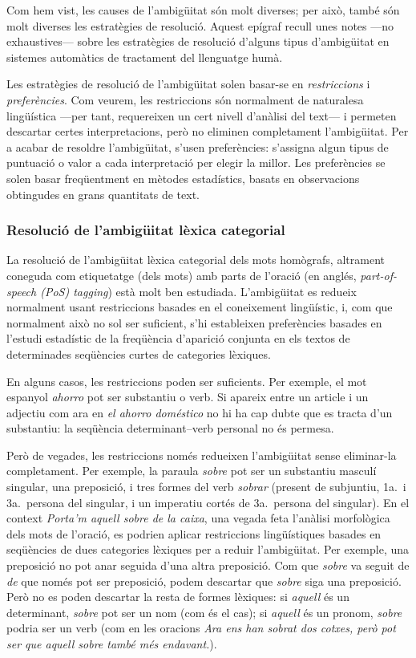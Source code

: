 Com hem vist, les causes de l'ambigüitat són molt diverses; per això,
també són molt diverses les estratègies de resolució. Aquest epígraf
recull unes notes ---no exhaus\-tives--- sobre les estratègies de
resolució d'alguns tipus d'ambigüitat en sistemes automàtics de
tractament del llenguatge humà.

Les estratègies de resolució de l'ambigüitat solen basar-se en
\emph{restriccions} i \emph{preferències}. Com veurem, les
restriccions són normalment de naturalesa lingüística ---per tant,
requereixen un cert nivell d'anàlisi del text--- i permeten descartar
certes interpretacions, però no eliminen completament l'ambigüitat.
Per a acabar de resoldre l'ambigüitat, s'usen preferències: s'assigna
algun tipus de puntuació o valor a cada interpretació per elegir la
millor. Les preferències se solen basar freqüentment en mètodes
estadístics, basats en observacions obtingudes en grans quantitats de
text.

\subsubsection{Resolució de l'ambigüitat lèxica categorial}
\label{s3:reshom}
La resolució de l'ambigüitat lèxica categorial dels mots homògrafs,
altrament coneguda com etiquetatge (dels mots) amb parts de l'oració
(en anglés, \emph{part-of-speech (PoS) tagging}) està molt ben
estudiada.  L'ambigüitat es redueix normalment usant restriccions
basades en el coneixement lingüístic, i, com que normalment això no
sol ser suficient, s'hi estableixen preferències basades en l'estudi
estadístic de la freqüència d'aparició conjunta en els textos de
determinades seqüències curtes de categories lèxiques.

En alguns casos, les restriccions poden ser suficients. Per exemple,
el mot espanyol \emph{ahorro} pot ser substantiu o verb. Si apareix
entre un article i un adjectiu com ara en \emph{el ahorro doméstico}
no hi ha cap dubte que es tracta d'un substantiu: la seqüència
determinant--verb personal no és permesa.

Però de vegades, les restriccions només redueixen l'ambigüitat sense
eliminar-la completament.  Per exemple, la paraula \emph{sobre} pot
ser un substantiu masculí singular, una preposició, i tres formes del
verb \emph{sobrar} (present de subjuntiu, 1a.\ i 3a.\ persona del
singular, i un imperatiu cortés de 3a.\ persona del singular). En el
context \emph{Porta'm aquell sobre de la caixa}, una vegada feta
l'anàlisi morfològica dels mots de l'oració, es podrien aplicar
restriccions lingüístiques basades en seqüències de dues categories
lèxiques per a reduir l'ambigüitat. Per exemple, una preposició no pot
anar seguida d'una altra preposició. Com que \emph{sobre} va seguit de
\emph{de} que només pot ser preposició, podem descartar que
\emph{sobre} siga una preposició. Però no es poden descartar la resta
de formes lèxiques: si \emph{aquell} és un determinant, \emph{sobre}
pot ser un nom (com és el cas); si \emph{aquell} és un pronom,
\emph{sobre} podria ser un verb (com en les oracions \emph{Ara ens han
  sobrat dos cotxes, però pot ser que aquell sobre també més
  endavant.}).

